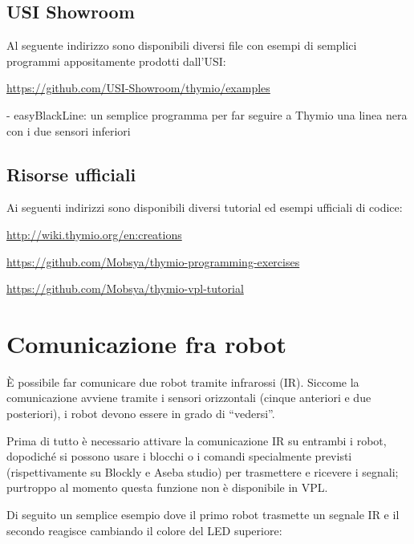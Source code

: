 \documentclass[12pt]{article}
\begin{document}
	\subsection{USI Showroom}
		
		Al seguente indirizzo sono disponibili diversi file con esempi di semplici programmi appositamente prodotti dall'USI:
		
		\url{https://github.com/USI-Showroom/thymio/examples}
		
		
		- easyBlackLine: un semplice programma per far seguire a Thymio una linea nera con i due sensori inferiori
		
	
	\subsection{Risorse ufficiali}
	
		Ai seguenti indirizzi sono disponibili diversi tutorial ed esempi ufficiali di codice:
	
		\url{http://wiki.thymio.org/en:creations}
		
		\url{https://github.com/Mobsya/thymio-programming-exercises}
		
		\url{https://github.com/Mobsya/thymio-vpl-tutorial}
	
	
\section{Comunicazione fra robot}\label{network}

	È possibile far comunicare due robot tramite infrarossi (IR). Siccome la comunicazione avviene tramite i sensori orizzontali (cinque anteriori e due posteriori), i robot devono essere in grado di ``vedersi''.
	
	Prima di tutto è necessario attivare la comunicazione IR su entrambi i robot, dopodiché si possono usare i blocchi o i comandi specialmente previsti (rispettivamente su Blockly e Aseba studio) per trasmettere e ricevere i segnali; purtroppo al momento questa funzione non è disponibile in VPL. 
	
	Di seguito un semplice esempio dove il primo robot trasmette un segnale IR e il secondo reagisce cambiando il colore del LED superiore: 
	
\end{document}

